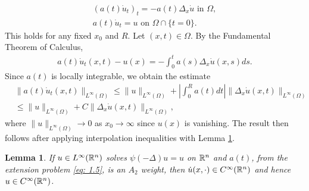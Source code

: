 \documentclass{article}
\newtheorem{lemma}[theorem]{Lemma}
\begin{document}
\begin{align*}
    (a(t) \dot{u}_t)_t= -a(t)\Delta_x \dot{u} \textrm{ in } \Omega, \\
    a(t)\dot{u}_t=u \textrm{ on }  \Omega \cap \{t=0\}.
    \tag{5.7}\label{eq: 5.7}
\end{align*}
This holds for any fixed $x_0$ and $R$. Let $(x,t) \in \Omega$. By the Fundamental Theorem of Calculus,
\begin{align*}
    a(t)\dot{u}_t(x,t) - u(x) = - \int_{0}^{t}a(s)\Delta_x \dot{u}(x,s)ds.
    \tag{5.8}\label{eq: 5.8}
\end{align*}
Since $a(t)$ is locally integrable, we obtain the estimate 
\begin{align*}
    & \|a(t)\dot{u}_t(x,t)\|_{L^\infty(\Omega)} \le  \|u\|_{L^\infty(\Omega)} + \left|\int_{0}^{R}a(t)dt\right| \|\Delta_x \dot{u}(x,t)\|_{L^\infty(\Omega)} \\
    & \le \|u\|_{L^\infty(\Omega)} + C\|\Delta_x \dot{u}(x,t)\|_{L^\infty(\Omega)},
    \tag{5.9}\label{eq: 5.9}
\end{align*}
where $\|u\|_{L^\infty(\Omega)} \to 0$ as $x_0 \to \infty$ since $u(x)$ is vanishing. The result then follows after applying interpolation inequalities \cite[(6.83), (6.85)]{gilbarg} with Lemma \ref{lm 5.4}. \qedsymbol  



\begin{lemma}
\label{lm 5.4}
If $u \in L^\infty(\mathbb{R}^n)$ solves $\psi(-\Delta) u = u$ on $\mathbb{R}^n$ and $a(t)$, from the extension problem \eqref{eq: 1.5}, is an $A_2$ weight, then $\dot{u}(x, \cdot) \in C^\infty(\mathbb{R}^n)$ and hence $u \in C^\infty(\mathbb{R}^n)$.
\end{lemma}
\end{document}
